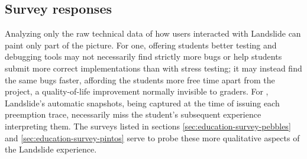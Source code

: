 \subsection{Survey responses}
\label{sec:education-eval-survey}

Analyzing only the raw technical data of how users interacted with Landslide can paint only part of the picture.
For one, offering students better testing and debugging tools
may not necessarily find strictly more bugs or help students submit more correct implementations
than with stress testing;
it may instead find the same bugs faster,
affording the students more free time apart from the project,
a quality-of-life improvement normally invisible to graders.
For , Landslide's automatic snapshots, being captured at the time of issuing each preemption trace,
necessarily miss the student's subsequent experience interpreting them.
The surveys listed in sections \cref{sec:education-survey-pebbles} and \cref{sec:education-survey-pintos}
serve to probe these more qualitative aspects of the Landslide experience.

